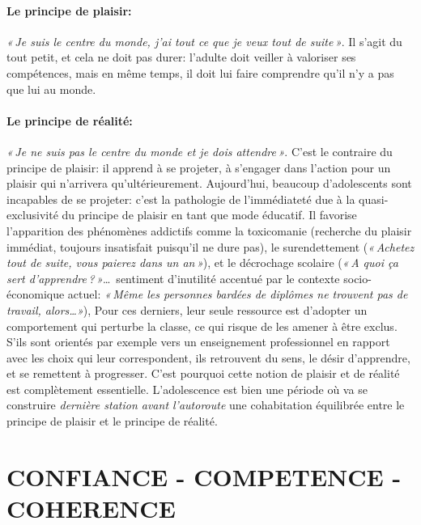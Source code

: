 \documentclass[11pt]{article} %
\begin{document}
  \paragraph{Le principe de plaisir:} \textit{« Je suis le centre du monde, j'ai tout ce que je veux tout de suite »}. Il s'agit du tout petit, et cela ne doit pas durer: l'adulte doit veiller à valoriser ses compétences, mais en même temps, il doit lui faire comprendre qu'il n'y a pas que lui au monde.

  \paragraph{Le principe de réalité:} \textit{« Je ne suis pas le centre du monde et je dois attendre »}. C'est le contraire du principe de plaisir: il apprend à se projeter, à s'engager dans l'action pour un plaisir qui n'arrivera qu'ultérieurement.\newline
  Aujourd'hui, beaucoup d'adolescents sont incapables de se projeter: c'est la pathologie de l'immédiateté due à la quasi-exclusivité du principe de plaisir en tant que mode éducatif. Il favorise l'apparition des phénomènes addictifs comme la toxicomanie (recherche du plaisir immédiat, toujours insatisfait puisqu'il ne dure pas), le surendettement (\textit{« Achetez tout de suite, vous paierez dans un an »}), et le décrochage scolaire (\textit{« A quoi ça sert d'apprendre ? »}\dots\ sentiment d'inutilité accentué par le contexte socio-économique actuel: \textit{« Même les personnes bardées de diplômes ne trouvent pas de travail, alors\dots »}), Pour ces derniers, leur seule ressource est d'adopter un comportement qui perturbe la classe, ce qui risque de les amener à être exclus. S'ils sont orientés par exemple vers un enseignement professionnel en rapport avec les choix qui leur correspondent, ils retrouvent du sens, le désir d'apprendre, et se remettent à progresser. C'est pourquoi cette notion de plaisir et de réalité est complètement essentielle.\newline
  L'adolescence est bien une période où va se construire \textit{dernière station avant l'autoroute }une cohabitation équilibrée entre le principe de plaisir et le principe de réalité.


\section{CONFIANCE - COMPETENCE - COHERENCE}
\end{document}
